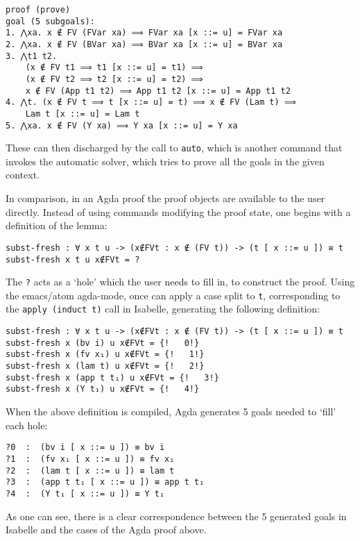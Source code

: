\documentclass[a4paper, 12pt, twoside]{style/ociamthesis}
\theoremstyle{plain}
\theoremstyle{definition}
\theoremstyle{remark}
\begin{document}
\begin{verbatim}
proof (prove)
goal (5 subgoals):
1. ⋀xa. x ∉ FV (FVar xa) ⟹ FVar xa [x ::= u] = FVar xa
2. ⋀xa. x ∉ FV (BVar xa) ⟹ BVar xa [x ::= u] = BVar xa
3. ⋀t1 t2.
    (x ∉ FV t1 ⟹ t1 [x ::= u] = t1) ⟹
    (x ∉ FV t2 ⟹ t2 [x ::= u] = t2) ⟹
    x ∉ FV (App t1 t2) ⟹ App t1 t2 [x ::= u] = App t1 t2
4. ⋀t. (x ∉ FV t ⟹ t [x ::= u] = t) ⟹ x ∉ FV (Lam t) ⟹ 
    Lam t [x ::= u] = Lam t
5. ⋀xa. x ∉ FV (Y xa) ⟹ Y xa [x ::= u] = Y xa
\end{verbatim}

These can then discharged by the call to \texttt{auto}, which is another
command that invokes the automatic solver, which tries to prove all the
goals in the given context.

In comparison, in an Agda proof the proof objects are available to the
user directly. Instead of using commands modifying the proof state, one
begins with a definition of the lemma:

\begin{verbatim}
subst-fresh : ∀ x t u -> (x∉FVt : x ∉ (FV t)) -> (t [ x ::= u ]) ≡ t
subst-fresh x t u x∉FVt = ?
\end{verbatim}

The \texttt{?} acts as a `hole' which the user needs to fill in, to
construct the proof. Using the emacs/atom agda-mode, once can apply a
case split to \texttt{t}, corresponding to the \texttt{apply (induct t)}
call in Isabelle, generating the following definition:

\begin{verbatim}
subst-fresh : ∀ x t u -> (x∉FVt : x ∉ (FV t)) -> (t [ x ::= u ]) ≡ t
subst-fresh x (bv i) u x∉FVt = {!   0!}
subst-fresh x (fv x₁) u x∉FVt = {!   1!}
subst-fresh x (lam t) u x∉FVt = {!   2!}
subst-fresh x (app t t₁) u x∉FVt = {!   3!}
subst-fresh x (Y t₁) u x∉FVt = {!   4!}
\end{verbatim}

When the above definition is compiled, Agda generates 5 goals needed to
`fill' each hole:

\begin{verbatim}
?0  :  (bv i [ x ::= u ]) ≡ bv i
?1  :  (fv x₁ [ x ::= u ]) ≡ fv x₁
?2  :  (lam t [ x ::= u ]) ≡ lam t
?3  :  (app t t₁ [ x ::= u ]) ≡ app t t₁
?4  :  (Y t₁ [ x ::= u ]) ≡ Y t₁
\end{verbatim}

As one can see, there is a clear correspondence between the 5 generated
goals in Isabelle and the cases of the Agda proof above.
\end{document}
